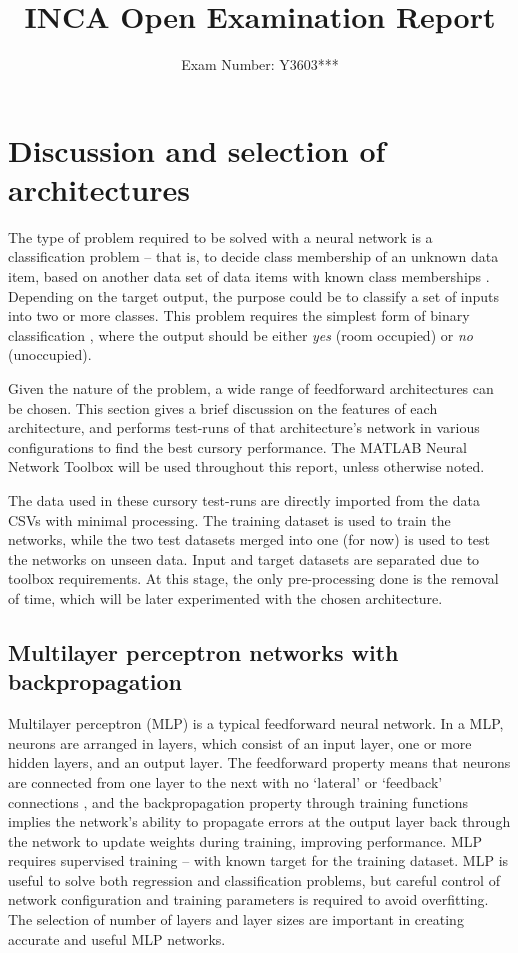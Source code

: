 \documentclass[10pt, oneside]{article}
\title{\vspace{-1.6cm}INCA Open Examination Report}
\author{Exam Number: Y3603***}
\date{}
\begin{document}
\maketitle
\section{Discussion and selection of architectures} \label{sec:architectures}
The type of problem required to be solved with a neural network is a classification problem -- that is, to decide class membership of an unknown data item, based on another data set of data items with known class memberships \cite[Sec. 2]{Dreiseitl2002352}. Depending on the target output, the purpose could be to classify a set of inputs into two or more classes. This problem requires the simplest form of binary classification \cite[Fig. 4]{candanedo2016accurate}, where the output should be either \textit{yes} (room occupied) or \textit{no} (unoccupied). 

Given the nature of the problem, a wide range of feedforward architectures can be chosen. This section gives a brief discussion on the features of each architecture, and performs test-runs of that architecture's network in various configurations to find the best cursory performance. The MATLAB Neural Network Toolbox \cite{kohonen2014matlab} will be used throughout this report, unless otherwise noted.

The data used in these cursory test-runs are directly imported from the data CSVs with minimal processing. The training dataset is used to train the networks, while the two test datasets merged into one (for now) is used to test the networks on unseen data. Input and target datasets are separated due to toolbox requirements. At this stage, the only pre-processing done is the removal of time, which will be later experimented with the chosen architecture.

\subsection{Multilayer perceptron networks with backpropagation} \label{subsec:mlp-test}

Multilayer perceptron (MLP) is a typical feedforward neural network. In a MLP, neurons are arranged in layers, which consist of an input layer, one or more hidden layers, and an output layer. The feedforward property means that neurons are connected from one layer to the next with no `lateral' or `feedback' connections \cite{som-lecture}, and the backpropagation property through training functions implies the network's ability to propagate errors at the output layer back through the network to update weights during training, improving performance. MLP requires supervised training -- with known target for the training dataset. MLP is useful to solve both regression and classification problems, but careful control of network configuration and training parameters is required to avoid overfitting. The selection of number of layers and layer sizes are important in creating accurate and useful MLP networks.
\end{document}
